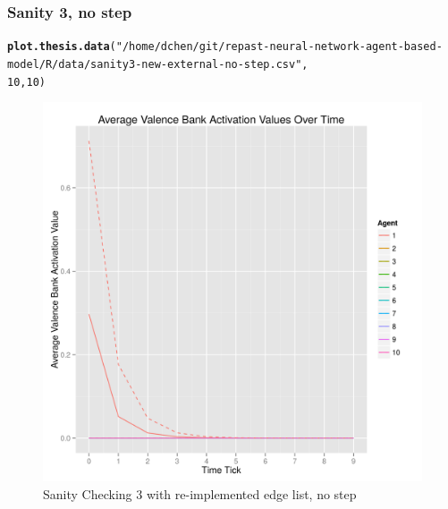 \documentclass{article}\usepackage[]{graphicx}\usepackage[]{color}
\makeatletter
\def\maxwidth{ %
  \ifdim\Gin@nat@width>\linewidth
    \linewidth
  \else
    \Gin@nat@width
  \fi
}
\newcommand{\hlnum}[1]{\textcolor[rgb]{0.686,0.059,0.569}{#1}}%
\newcommand{\hlstr}[1]{\textcolor[rgb]{0.192,0.494,0.8}{#1}}%
\newcommand{\hlstd}[1]{\textcolor[rgb]{0.345,0.345,0.345}{#1}}%
\newcommand{\hlkwd}[1]{\textcolor[rgb]{0.737,0.353,0.396}{\textbf{#1}}}%
\newenvironment{kframe}{%
 \def\at@end@of@kframe{}%
 \ifinner\ifhmode%
  \def\at@end@of@kframe{\end{minipage}}%
  \begin{minipage}{\columnwidth}%
 \fi\fi%
 \def\FrameCommand##1{\hskip\@totalleftmargin \hskip-\fboxsep
 \colorbox{shadecolor}{##1}\hskip-\fboxsep
     \hskip-\linewidth \hskip-\@totalleftmargin \hskip\columnwidth}%
 \MakeFramed {\advance\hsize-\width
   \@totalleftmargin\z@ \linewidth\hsize
   \@setminipage}}%
 {\par\unskip\endMakeFramed%
 \at@end@of@kframe}
\newenvironment{knitrout}{}{} %
\makeatother
\begin{document}
\subsubsection{Sanity 3, no step}
\begin{knitrout}
\color{fgcolor}\begin{kframe}
\begin{alltt}
\hlkwd{plot.thesis.data}\hlstd{(}\hlstr{"/home/dchen/git/repast-neural-network-agent-based-model/R/data/sanity3-new-external-no-step.csv"}\hlstd{,}
    \hlnum{10}\hlstd{,} \hlnum{10}\hlstd{)}
\end{alltt}
\end{kframe}\begin{figure}[]

\includegraphics[width=\maxwidth]{figure/plot-sanity-3-v2-nostep} \caption[Sanity Checking 3 with re-implemented edge list, no step]{Sanity Checking 3 with re-implemented edge list, no step\label{fig:plot-sanity-3-v2-nostep}}
\end{figure}


\end{knitrout}


\newpage
\end{document}

